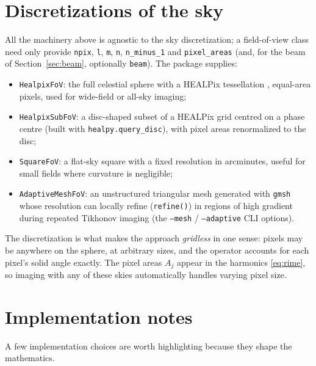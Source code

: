 \documentclass[11pt,a4paper]{article}
\begin{document}
\section{Discretizations of the sky}
\label{sec:fov}

All the machinery above is agnostic to the sky discretization; a field-of-view
class need only provide \texttt{npix}, \texttt{l}, \texttt{m}, \texttt{n},
\texttt{n\_minus\_1} and \texttt{pixel\_areas} (and, for the beam of
Section~\ref{sec:beam}, optionally \texttt{beam}). The package supplies:

\begin{itemize}
  \item \texttt{HealpixFoV}: the full celestial sphere with a HEALPix
        tessellation \cite{gorski2005}, equal-area pixels, used for wide-field
        or all-sky imaging;
  \item \texttt{HealpixSubFoV}: a disc-shaped subset of a HEALPix grid
        centred on a phase centre (built with \texttt{healpy.query\_disc}),
        with pixel areas renormalized to the disc;
  \item \texttt{SquareFoV}: a flat-sky square with a fixed resolution in
        arcminutes, useful for small fields where curvature is negligible;
  \item \texttt{AdaptiveMeshFoV}: an unstructured triangular mesh generated
        with \texttt{gmsh} whose resolution can locally refine
        (\texttt{refine()}) in regions of high gradient during repeated
        Tikhonov imaging (the \texttt{--mesh} / \texttt{--adaptive} CLI
        options).
\end{itemize}

The discretization is what makes the approach \emph{gridless} in one sense:
pixels may be anywhere on the sphere, at arbitrary sizes, and the operator
accounts for each pixel's solid angle exactly. The pixel areas $A_j$ appear in
the harmonics \eqref{eq:rime}, so imaging with any of these skies automatically
handles varying pixel size.

\section{Implementation notes}
\label{sec:impl}

A few implementation choices are worth highlighting because they shape the
mathematics.
\end{document}
